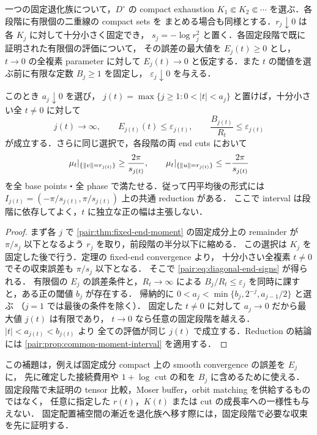 \begin{lemma}
\label{pair:lem:diagonal-fixed-end}
一つの固定退化族について，$D^\circ$ の compact exhaustion
$K_1\Subset K_2\Subset\cdots$ を選ぶ．各段階に有限個の二重線の compact sets を
まとめる場合も同様とする．$r_j\downarrow0$ は各 $K_j$ に対して十分小さく固定でき，
$s_j=-\log r_j^2$ と置く．各固定段階で既に証明された有限個の評価について，
その誤差の最大値を $E_j(t)\ge0$ とし，$t\to0$ の全複素 parameter に対して
$E_j(t)\to0$ と仮定する．また $t$ の閾値を選ぶ前に有限な定数 $B_j\ge1$ を固定し，
$\varepsilon_j\downarrow0$ を与える．

このとき $a_j\downarrow0$ を選び，
$j(t)=\max\{j\ge1:0<|t|<a_j\}$ と置けば，十分小さい全 $t\ne0$ に対して
\begin{equation}\label{pair:eq:diagonal-fixed-stage}
 j(t)\longrightarrow\infty,\qquad
 E_{j(t)}(t)\le\varepsilon_{j(t)},\qquad
 \frac{B_{j(t)}}{R_t}\le\varepsilon_{j(t)}
\end{equation}
が成立する．さらに同じ選択で，各段階の両 end cuts において
\begin{equation}\label{pair:eq:diagonal-end-signs}
 \mu_t|_{\{\left\lVert v\right\rVert=r_{j(t)}\}}\ge\frac{2\pi}{s_{j(t)}},
 \qquad
 \mu_t|_{\{\left\lVert u\right\rVert=r_{j(t)}\}}\le-\frac{2\pi}{s_{j(t)}}
\end{equation}
を全 base points・全 phase で満たせる．従って円平均後の形式には
$I_{j(t)}=(-\pi/s_{j(t)},\pi/s_{j(t)})$ 上の共通 reduction がある．
ここで interval は段階に依存してよく，$t$ に独立な正の幅は主張しない．
\end{lemma}

\begin{proof}
まず各 $j$ で \cref{pair:thm:fixed-end-moment} の固定成分上の remainder が
$\pi/s_j$ 以下となるよう $r_j$ を取り，前段階の半分以下に縮める．
この選択は $K_j$ を固定した後で行う．定理の fixed-end convergence より，
十分小さい全複素 $t\ne0$ でその収束誤差も $\pi/s_j$ 以下となる．
そこで \eqref{pair:eq:diagonal-end-signs} が得られる．
有限個の $E_j$ の誤差条件と，$R_t\to\infty$ による
$B_j/R_t\le\varepsilon_j$ を同時に課すと，ある正の閾値 $b_j$ が存在する．
帰納的に $0<a_j<\min\{b_j,2^{-j},a_{j-1}/2\}$ と選ぶ
（$j=1$ では最後の条件を除く）．
固定した $t\ne0$ に対して $a_j\to0$ だから最大値 $j(t)$ は有限であり，
$t\to0$ なら任意の固定段階を越える．$|t|<a_{j(t)}<b_{j(t)}$ より
全ての評価が同じ $j(t)$ で成立する．Reduction の結論には
\cref{pair:prop:common-moment-interval} を適用する．
\end{proof}

この補題は，例えば固定成分 compact 上の smooth convergence の誤差を $E_j$ に，
先に確定した接続費用や $1+\log$ cut の和を $B_j$ に含めるために使える．
固定段階で未証明の tensor 比較，Moser buffer，orbit matching を供給するものではなく，
任意に指定した $r(t)$，$K(t)$ または cut の成長率への一様性も与えない．
固定配置補空間の漸近を退化族へ移す際には，固定段階で必要な収束を先に証明する．

